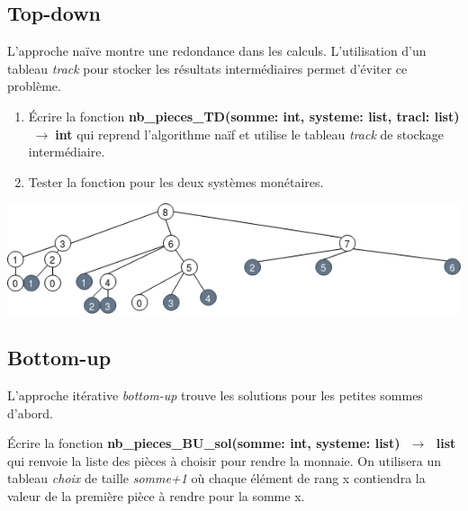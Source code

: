 \documentclass[a4paper,11pt]{article}
\begin{document}
\subsection{Top-down}
L'approche naïve montre une redondance dans les calculs. L'utilisation d'un tableau \emph{track} pour stocker les résultats intermédiaires permet d'éviter ce problème.
\begin{activite}
\begin{enumerate}
    \item Écrire la fonction \textbf{nb\_pieces\_TD(somme: int, systeme: list, tracl: list) $\;\rightarrow\;$int} qui reprend l'algorithme naïf et utilise le tableau \emph{track} de stockage intermédiaire.
    \item Tester la fonction pour les deux systèmes monétaires.
\end{enumerate}
\end{activite}
\begin{center}
    \centering
    \includegraphics[width=17cm]{ressources/appel-dyn-8.png}
    \label{IMG}
\end{center}
\subsection{Bottom-up}
L'approche itérative \emph{bottom-up} trouve les solutions pour les petites sommes d'abord.
\begin{center}
    
    \label{bu}
\end{center}
\begin{activite}
Écrire la fonction \textbf{nb\_pieces\_BU\_sol(somme: int, systeme: list) $\;\rightarrow\;$ list} qui renvoie la liste des pièces à choisir pour rendre la monnaie. On utilisera un tableau \emph{choix} de taille \emph{somme+1} où chaque élément de rang x contiendra la valeur de la première pièce à rendre pour la somme x.
\end{activite}
\end{document}
